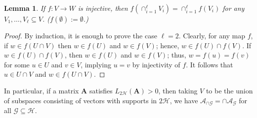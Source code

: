 \documentclass[journal, twocolumn]{IEEEtran}
\newtheorem{lemma}{Lemma}
\begin{document}
\begin{lemma}\label{spanIntersectionLemma}
If $f: V \to W$ is injective, then $f\left(\cap_{i=1}^\ell V_i \right) =  \cap_{i=1}^\ell f\left(V_i\right)$ for any $V_1, \ldots, V_\ell \subseteq V$. ($f(\emptyset):=\emptyset$.)
\end{lemma}
\begin{proof}
By induction, it is enough to prove the case $\ell = 2$. Clearly, for any map $f$, if $w \in f(U \cap V)$ then $w \in f(U)$ and $w \in f(V)$; hence, $w \in f(U) \cap f(V)$. If $w \in f(U) \cap f(V)$, then $w \in f(U)$ and $w \in f(V)$; thus, $w = f(u) = f(v)$ for some $u \in U$ and $v \in V$, implying $u = v$ by injectivity of $f$. It follows that $u \in U \cap V$ and $w \in f(U \cap V)$.
\end{proof}
In particular, if a matrix $\mathbf{A}$ satisfies $L_{2\mathcal{H}}(\mathbf{A}) > 0$, then taking $V$ to be the union of subspaces consisting of vectors with supports in $2\mathcal{H}$, we have $\bm{\mathcal{A}}_{\cap \mathcal{G}} = \cap \bm{\mathcal{A}}_\mathcal{G}$ for all $\mathcal{G} \subseteq \mathcal{H}$.
\end{document}
